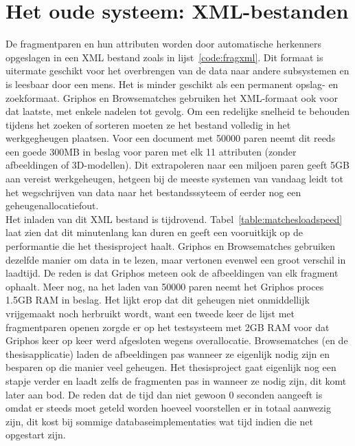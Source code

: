 \section{Het oude systeem: XML-bestanden}
De fragmentparen en hun attributen worden door automatische herkenners opgeslagen in een XML bestand zoals in lijst~\ref{code:fragxml}. Dit formaat is uitermate geschikt voor het overbrengen van de data naar andere subsystemen en is leesbaar door een mens. Het is minder geschikt als een permanent opslag- en zoekformaat. Griphos en Browsematches gebruiken het XML-formaat ook voor dat laatste, met enkele nadelen tot gevolg. Om een redelijke snelheid te behouden tijdens het zoeken of sorteren moeten ze het bestand volledig in het werkgegheugen plaatsen. Voor een document met 50000 paren neemt dit reeds een goede 300MB in beslag voor paren met elk 11 attributen (zonder afbeeldingen of 3D-modellen). Dit extrapoleren naar een miljoen paren geeft 5GB aan vereist werkgeheugen, hetgeen bij de meeste systemen van vandaag leidt tot het wegschrijven van data naar het bestandsssyteem of eerder nog een geheugenallocatiefout.\\



Het inladen van dit XML bestand is tijdrovend. Tabel~\ref{table:matchesloadspeed} laat zien dat dit minutenlang kan duren en geeft een vooruitkijk op de performantie die het thesisproject haalt. Griphos en Browsematches gebruiken dezelfde manier om data in te lezen, maar vertonen evenwel een groot verschil in laadtijd. De reden is dat Griphos meteen ook de afbeeldingen van elk fragment ophaalt. Meer nog, na het laden van 50000 paren neemt het Griphos proces 1.5GB RAM in beslag. Het lijkt erop dat dit geheugen niet onmiddellijk vrijgemaakt noch herbruikt wordt, want een tweede keer de lijst met fragmentparen openen zorgde er op het testsysteem met 2GB RAM voor dat Griphos keer op keer werd afgesloten wegens overallocatie. Browsematches (en de thesisapplicatie) laden de afbeeldingen pas wanneer ze eigenlijk nodig zijn en besparen op die manier veel geheugen. Het thesisproject gaat eigenlijk nog een stapje verder en laadt zelfs de fragmenten pas in wanneer ze nodig zijn, dit komt later aan bod. De reden dat de tijd dan niet gewoon 0 seconden aangeeft is omdat er steeds moet geteld worden hoeveel voorstellen er in totaal aanwezig zijn, dit kost bij sommige databaseimplementaties wat tijd indien die net opgestart zijn.

